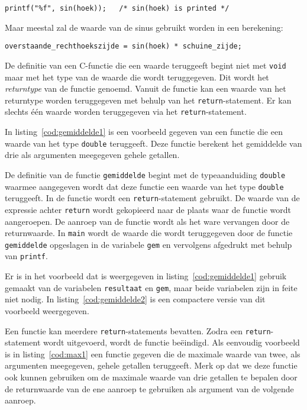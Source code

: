\hspace*{1em}\texttt{printf("\%f", sin(hoek)); \ \ /* sin(hoek) is printed */}

Maar meestal zal de waarde van de sinus gebruikt worden in een berekening:

\hspace*{1em}\texttt{overstaande\_rechthoekszijde = sin(hoek) * schuine\_zijde;}

De definitie van een C-functie die een waarde teruggeeft begint niet met \texttt{void} maar met het type van de waarde die wordt teruggegeven.
Dit wordt het \textsl{returntype} van de functie genoemd.
Vanuit de functie kan een waarde van het returntype worden teruggegeven met behulp van het \texttt{return}-statement. Er kan slechts één waarde worden teruggegeven via het \texttt{return}-statement.

In listing~\ref{cod:gemiddelde1} is een voorbeeld gegeven van een functie die een waarde van het type \texttt{double} teruggeeft.
Deze functie berekent het gemiddelde van drie als argumenten meegegeven gehele getallen.
  

De definitie van de functie \texttt{gemiddelde} begint met de typeaanduiding \texttt{double} waarmee aangegeven wordt dat deze functie een waarde van het type \texttt{double} teruggeeft.
In de functie wordt een \texttt{return}-statement gebruikt.
De waarde van de expressie achter \texttt{return} wordt gekopieerd naar de plaats waar de functie wordt aangeroepen.
De aanroep van de functie wordt als het ware vervangen door de returnwaarde.
In \texttt{main} wordt de waarde die wordt teruggegeven door de functie \texttt{gemiddelde} opgeslagen in de variabele \texttt{gem} en vervolgens afgedrukt met behulp van \texttt{printf}.

Er is in het voorbeeld dat is weergegeven in listing~\ref{cod:gemiddelde1} gebruik gemaakt van de variabelen \texttt{resultaat} en \texttt{gem}, maar beide variabelen zijn in feite niet nodig.
In listing~\ref{cod:gemiddelde2} is een compactere versie van dit voorbeeld weergegeven.


Een functie kan meerdere \texttt{return}-statements bevatten. 
Zodra een \texttt{return}-statement wordt uitgevoerd, wordt de functie beëindigd.
Als eenvoudig voorbeeld is in listing~\ref{cod:max1} een functie gegeven die de maximale waarde van twee, als argumenten meegegeven, gehele getallen teruggeeft.
Merk op dat we deze functie ook kunnen gebruiken om de maximale waarde van drie getallen te bepalen door de returnwaarde van de ene aanroep te gebruiken als argument van de volgende aanroep. 

